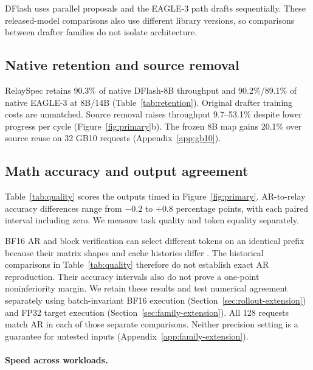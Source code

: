 \documentclass{article}
\begin{document}
DFlash uses parallel proposals and the EAGLE-3 path drafts sequentially.
These released-model comparisons also use different library versions,
so comparisons between drafter families do not isolate architecture.

\subsection{Native retention and source removal}
RelaySpec retains 90.3\% of native DFlash-8B throughput and 90.2\%/89.1\%
of native EAGLE-3 at 8B/14B (Table~\ref{tab:retention}). Original drafter
training costs are unmatched. Source removal raises throughput
9.7--53.1\% despite lower progress per cycle (Figure~\ref{fig:primary}b).
The frozen 8B map gains 20.1\% over source reuse on 32 GB10 requests
(Appendix~\ref{app:gb10}).

\subsection{Math accuracy and output agreement}

Table~\ref{tab:quality} scores the outputs timed in Figure~\ref{fig:primary}.
AR-to-relay accuracy differences range from $-0.2$ to $+0.8$ percentage
points, with each paired interval including zero. We measure task quality
and token equality separately.

\begin{table}[H]
\caption{MATH-500 accuracy in percent. Difference is RelaySpec minus AR
in percentage points. Token matches count identical full output sequences.}
\label{tab:quality}
\centering\small
\setlength{\tabcolsep}{4pt}

\end{table}

BF16 AR and block verification can select different tokens on an
identical prefix because their matrix shapes and cache histories differ
\citep{yuan2025numerical}.
The historical comparisons in Table~\ref{tab:quality} therefore do not
establish exact AR reproduction. Their accuracy intervals also do not
prove a one-point noninferiority margin. We retain these results and test
numerical agreement separately using batch-invariant BF16 execution
(Section~\ref{sec:rollout-extension}) and FP32 target execution
(Section~\ref{sec:family-extension}). All 128 requests match AR in each
of those separate comparisons. Neither precision setting is a guarantee
for untested inputs (Appendix~\ref{app:family-extension}).

\paragraph{Speed across workloads.}
\end{document}
